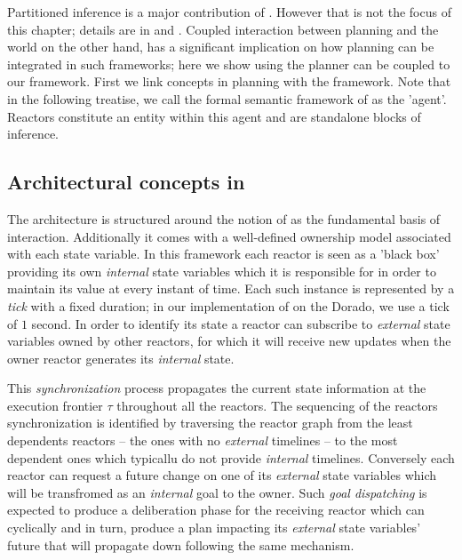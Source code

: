 Partitioned inference is a major contribution of \rx. However that is
not the focus of this chapter; details are in \cite{py10} and
\cite{rajan12}. Coupled interaction between planning and the world on
the other hand, has a significant implication on how planning can be
integrated in such frameworks; here we show using the \eu planner can
be coupled to our framework. First we link concepts in \eu planning
with the \rx framework. Note that in the following treatise, we call
the formal semantic framework of \rx as the 'agent'. Reactors
constitute an entity within this agent and are standalone blocks of
inference.


\subsection{Architectural concepts in \rx}
\label{sec:arch:trex}

The \rx architecture is structured around the notion of  as the fundamental basis of interaction. Additionally it
comes with a well-defined ownership model associated with each state
variable. In this framework each reactor is seen as a 'black box'
providing its own {\em internal} state variables which it is
responsible for in order to maintain its value at every instant of
time. Each such instance is represented by a {\em tick} with a fixed
duration; in our implementation of \rx on the Dorado, we use a tick of
$1$ second. In order to identify its state a reactor can subscribe to
{\em external} state variables owned by other reactors, for which it
will receive new updates when the owner reactor generates its {\em
  internal} state. 

This {\em synchronization} process propagates the current state
information at the execution frontier $\tau$ throughout all the 
reactors. The sequencing of the reactors synchronization is identified
by traversing the reactor graph from the least dependents reactors --
the ones with no {\em external} timelines -- to the most dependent
ones which typicallu do not provide {\em internal} timelines.
Conversely each reactor can request a future change on one of 
its {\em external} state variables which will be transfromed as 
an {\em internal} goal to the owner. 
Such \emph{goal dispatching} is expected to produce a
deliberation phase for the receiving reactor which can cyclically and
in turn, produce a plan impacting its {\em external} state variables' 
future that will propagate down following the same mechanism.

